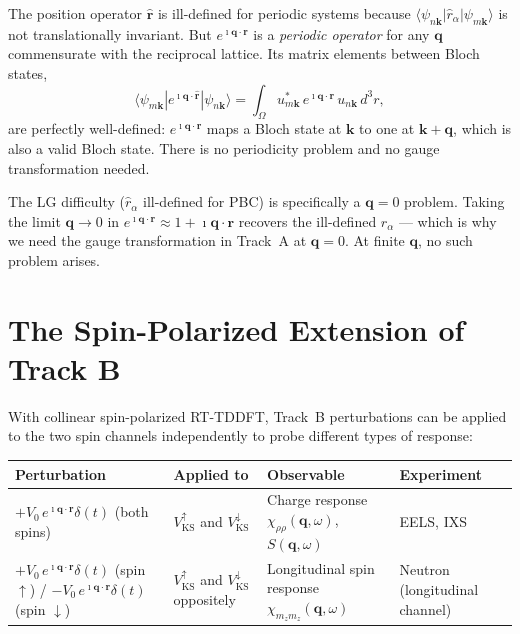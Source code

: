 \documentclass[11pt]{article}
\newcommand{\iunit}{\imath}
\newcommand{\rhat}{\hat{\mathbf{r}}}
\newcommand{\VKS}{V_{\mathrm{KS}}}
\begin{document}
The position operator $\rhat$ is ill-defined for periodic systems
because $\langle\psi_{n\mathbf{k}}|\hat{r}_\alpha|\psi_{m\mathbf{k}}\rangle$
is not translationally invariant.
But $e^{\iunit\mathbf{q}\cdot\mathbf{r}}$ is a \emph{periodic
operator} for any $\mathbf{q}$ commensurate with the reciprocal
lattice.
Its matrix elements between Bloch states,
\begin{equation}
  \langle\psi_{m\mathbf{k}}|e^{\iunit\mathbf{q}\cdot\rhat}|\psi_{n\mathbf{k}}\rangle
  = \int_\Omega u_{m\mathbf{k}}^*\,e^{\iunit\mathbf{q}\cdot\mathbf{r}}\,
    u_{n\mathbf{k}}\,d^3r,
  \label{eq:periodic-me}
\end{equation}
are perfectly well-defined: $e^{\iunit\mathbf{q}\cdot\mathbf{r}}$
maps a Bloch state at $\mathbf{k}$ to one at $\mathbf{k}+\mathbf{q}$,
which is also a valid Bloch state.
There is no periodicity problem and no gauge transformation needed.

The LG difficulty ($\hat{r}_\alpha$ ill-defined for PBC) is
specifically a $\mathbf{q}=0$ problem.
Taking the limit $\mathbf{q}\to0$ in
$e^{\iunit\mathbf{q}\cdot\mathbf{r}}\approx1+\iunit\mathbf{q}\cdot\mathbf{r}$
recovers the ill-defined $\hat{r}_\alpha$ --- which is why we need
the gauge transformation in Track~A at $\mathbf{q}=0$.
At finite $\mathbf{q}$, no such problem arises.

\section{The Spin-Polarized Extension of Track B}

With collinear spin-polarized RT-TDDFT, Track~B perturbations can
be applied to the two spin channels independently to probe
different types of response:

\begin{center}
\begin{tabular}{p{3.5cm}p{3.5cm}p{4cm}p{2.0cm}}
\toprule
\textbf{Perturbation} & \textbf{Applied to} & \textbf{Observable}
  & \textbf{Experiment} \\
\midrule
$+V_0\,e^{\iunit\mathbf{q}\cdot\mathbf{r}}\delta(t)$ (both spins)
  & $\VKS^\uparrow$ and $\VKS^\downarrow$
  & Charge response $\chi_{\rho\rho}(\mathbf{q},\omega)$, $S(\mathbf{q},\omega)$
  & EELS, IXS \\
\midrule
$+V_0\,e^{\iunit\mathbf{q}\cdot\mathbf{r}}\delta(t)$ (spin $\uparrow$) /
$-V_0\,e^{\iunit\mathbf{q}\cdot\mathbf{r}}\delta(t)$ (spin $\downarrow$)
  & $\VKS^\uparrow$ and $\VKS^\downarrow$ oppositely
  & Longitudinal spin response $\chi_{m_z m_z}(\mathbf{q},\omega)$
  & Neutron (longitudinal channel) \\
\bottomrule
\end{tabular}
\end{center}
\end{document}
